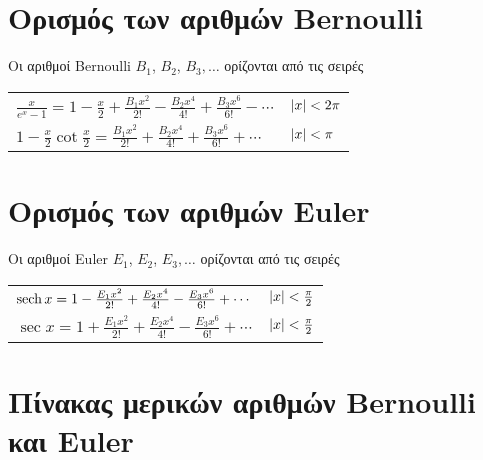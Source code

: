






\section{Ορισμός των αριθμών \textlatin{Bernoulli}}

Οι αριθμοί \textlatin{Bernoulli} $ B_{1} $, $ B_{2} $, $ B_{3}, \ldots $   
ορίζονται από τις σειρές

\begin{tabular}{ll}
	$ \frac{x}{e^{x} - 1} = 1 - \frac{x}{2} + \frac{B_{1} x^{2}}{2!} -
	\frac{B_{2} x^{4}}{4!} + \frac{B_{3} x^{6}}{6!} - \cdots $ & $ \abs{x} < 2
	\pi $ \\
	$ 1 - \frac{x}{2} \cot{\frac{x}{2}} = \frac{B_{1} x^{2}}{2!} +
	\frac{B_{2} x^{4}}{4!} + \frac{B_{3} x^{6}}{6!} + \cdots $ & $ \abs{x} < \pi $
\end{tabular}

\section{Ορισμός των αριθμών \textlatin{Euler}}

Οι αριθμοί \textlatin{Euler} $ E_{1} $, $ E_{2} $, $ E_{3}, \ldots $ ορίζονται
από τις σειρές

\begin{tabular}{ll}
	$ \sech{x} = 1 - \frac{E_{1} x^{2}}{2!} + \frac{E_{2} x^{4}}{4!} -
	\frac{E_{3} x^{6}}{6!} + \cdots $ & $ \abs{x} < \frac{\pi}{2} $ \\
	$ \sec{x} = 1 + \frac{E_{1} x^{2}}{2!} + \frac{E_{2} x^{4}}{4!} -
	\frac{E_{3} x^{6}}{6!} + \cdots $ & $ \abs{x} < \frac{\pi}{2}  $
\end{tabular}


\section{Πίνακας μερικών αριθμών \textlatin{Bernoulli} και \textlatin{Euler}}

